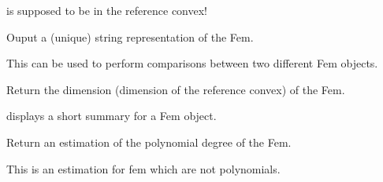 \documentclass[a4paper,11pt,english]{sphinxmanual}
\begin{document}
\begin{fulllineitems}
\begin{fulllineitems}
 is supposed to be in the reference convex!

\end{fulllineitems}


\begin{fulllineitems}
\label{\detokenize{python/cmdref_Fem:getfem.Fem.char}}
Ouput a (unique) string representation of the Fem.

This can be used to perform comparisons between two different Fem
objects.

\end{fulllineitems}


\begin{fulllineitems}
\label{\detokenize{python/cmdref_Fem:getfem.Fem.dim}}
Return the dimension (dimension of the reference convex) of the Fem.

\end{fulllineitems}


\begin{fulllineitems}
\label{\detokenize{python/cmdref_Fem:getfem.Fem.display}}
displays a short summary for a Fem object.

\end{fulllineitems}


\begin{fulllineitems}
\label{\detokenize{python/cmdref_Fem:getfem.Fem.estimated_degree}}
Return an estimation of the polynomial degree of the Fem.

This is an estimation for fem which are not polynomials.

\end{fulllineitems}



\end{fulllineitems}
\end{document}
